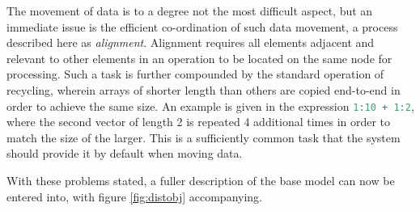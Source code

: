 \documentclass[a4paper,10pt]{article}
\begin{document}
The movement of data is to a degree not the most difficult aspect, but an
immediate issue is the efficient co-ordination of such data movement, a process
described here as \textit{alignment}.
Alignment requires all elements adjacent and relevant to other elements in an
operation to be located on the same node for processing.
Such a task is further compounded by the standard operation of recycling,
wherein arrays of shorter length than others are copied end-to-end in order to
achieve the same size.
An example is given in the expression \lstinline[language=R]{1:10 + 1:2}, where
the second vector of length 2 is repeated 4 additional times in order to match
the size of the larger.
This is a sufficiently common task that the system should provide it by default
when moving data.

With these problems stated, a fuller description of the base model can now be
entered into, with figure \ref{fig:distobj} accompanying.
\end{document}

